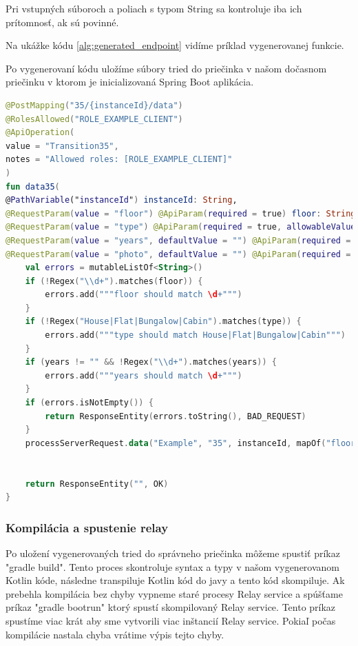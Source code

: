 Pri vstupných súboroch a poliach s typom String sa kontroluje iba ich prítomnosť, ak sú povinné.

Na ukážke kódu \ref{alg:generated_endpoint} vidíme príklad vygenerovanej funkcie.

Po vygenerovaní kódu uložíme súbory tried do priečinka v našom dočasnom priečinku v ktorom je inicializovaná Spring Boot aplikácia.

\begin{lstlisting}[float, caption={Príklad vygenerovanej funkcie},label={alg:generated_endpoint},language=Kotlin]
@PostMapping("35/{instanceId}/data")
@RolesAllowed("ROLE_EXAMPLE_CLIENT")
@ApiOperation(
value = "Transition35",
notes = "Allowed roles: [ROLE_EXAMPLE_CLIENT]"
)
fun data35(
@PathVariable("instanceId") instanceId: String,
@RequestParam(value = "floor") @ApiParam(required = true) floor: String,
@RequestParam(value = "type") @ApiParam(required = true, allowableValues = """[House, Flat, Bungalow, Cabin]""") type: String,
@RequestParam(value = "years", defaultValue = "") @ApiParam(required = false) years: String,
@RequestParam(value = "photo", defaultValue = "") @ApiParam(required = false) photo: MultipartFile ): ResponseEntity<String> {
	val errors = mutableListOf<String>()
	if (!Regex("\\d+").matches(floor)) {
		errors.add("""floor should match \d+""")
	}
	if (!Regex("House|Flat|Bungalow|Cabin").matches(type)) {
		errors.add("""type should match House|Flat|Bungalow|Cabin""")
	}
	if (years != "" && !Regex("\\d+").matches(years)) {
		errors.add("""years should match \d+""")
	}
	if (errors.isNotEmpty()) {
		return ResponseEntity(errors.toString(), BAD_REQUEST)
	}
	processServerRequest.data("Example", "35", instanceId, mapOf("floor" to floor, "type" to type, "years" to years, "photo" to photo ))
	

	return ResponseEntity("", OK)
}
\end{lstlisting}

\subsubsection{Kompilácia a spustenie relay}

Po uložení vygenerovaných tried do správneho priečinka môžeme spustiť príkaz "gradle build". Tento proces skontroluje syntax a typy v našom vygenerovanom Kotlin kóde, následne transpiluje Kotlin kód do javy a tento kód skompiluje. Ak prebehla kompilácia bez chyby vypneme staré procesy Relay service a spúšťame príkaz "gradle bootrun" ktorý spustí skompilovaný Relay service. Tento príkaz spustíme viac krát aby sme vytvorili viac inštancií Relay service. Pokiaľ počas kompilácie nastala chyba vrátime výpis tejto chyby.

